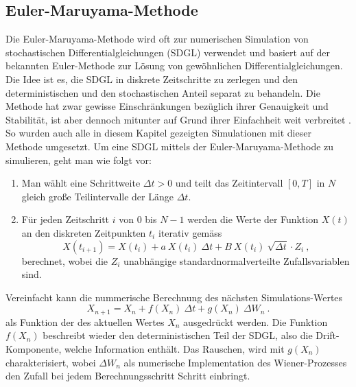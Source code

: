\subsection{Euler-Maruyama-Methode\label{brown:Simulation}}

Die Euler-Maruyama-Methode wird oft zur numerischen Simulation von stochastischen Differentialgleichungen (SDGL) verwendet und basiert auf der bekannten Euler-Methode zur Lösung von gewöhnlichen Differentialgleichungen. Die Idee ist es, die SDGL in diskrete Zeitschritte zu zerlegen und den deterministischen und den stochastischen Anteil separat zu behandeln. Die Methode hat zwar gewisse Einschränkungen bezüglich ihrer Genauigkeit und Stabilität, ist aber dennoch mitunter auf Grund ihrer Einfachheit weit verbreitet \cite{Bayram2018}. So wurden auch alle in diesem Kapitel gezeigten Simulationen mit dieser Methode umgesetzt. Um eine SDGL mittels der Euler-Maruyama-Methode zu simulieren, geht man wie folgt vor:




\begin{enumerate}
	\item Man wählt eine Schrittweite $ \Delta t > 0 $ und teilt das Zeitintervall $ [0, T] $ in $ N $ gleich große Teilintervalle der Länge $ \Delta t $.
	\item Für jeden Zeitschritt $ i $ von $ 0 $ bis $ N-1 $ werden die Werte der Funktion $ X(t) $ an den diskreten Zeitpunkten $ t_i $ iterativ gemäss
	\begin{equation}
		X(t_{i+1}) = X(t_i) + a \ X(t_i) \ \Delta t + B \ X(t_i) \ \sqrt{\Delta t} \cdot Z_i \ ,
	\end{equation}
	berechnet, wobei die $ Z_i $ unabhängige standardnormalverteilte Zufallsvariablen sind.
\end{enumerate}

Vereinfacht kann die nummerische Berechnung des nächsten Simulations-Wertes
\begin{equation}
	X_{n+1} = X_n + f(X_n) \ \Delta t + g(X_n) \ \Delta W_n \ .
\end{equation}
als Funktion der des aktuellen Wertes  $ X_n $ ausgedrückt werden. Die Funktion $ f(X_n) $ beschreibt wieder den deterministischen Teil der SDGL, also die Drift-Komponente, welche Information enthält. Das Rauschen, wird mit $ g(X_n) $ charakterisiert, wobei $ \Delta W_n $ als numerische Implementation des Wiener-Prozesses den Zufall bei jedem Berechnungsschritt Schritt einbringt.



